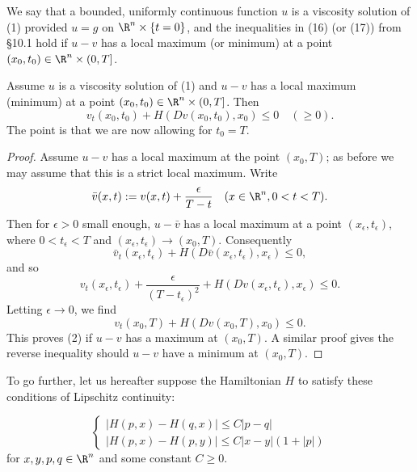 \begin{definition}
\label{def:viscosity-solution-finite-horizon}
We say that a bounded, uniformly continuous function $u$ is a viscosity solution of (1) provided $u = g$ on $\R^n \times \{t = 0\}$, and the inequalities in (16) (or (17)) from \S10.1 hold if $u - v$ has a local maximum (or minimum) at a point $(x_0, t_0) \in \R^n \times (0, T]$.
\end{definition}

\begin{lemma}
\label{lem:extrema-at-terminal-time}
Assume $u$ is a viscosity solution of (1) and $u - v$ has a local maximum (minimum) at a point $(x_0, t_0) \in \R^n \times (0, T]$. Then
\[
v_t(x_0, t_0) + H(Dv(x_0, t_0), x_0) \le 0 \quad (\ge 0).
\tag{2}
\]
The point is that we are now allowing for $t_0 = T$.
\end{lemma}
\begin{proof}
Assume $u - v$ has a local maximum at the point $(x_0, T)$; as before we may assume that this is a strict local maximum. Write
\[
\bar{v}(x,t) := v(x,t) + \frac{\epsilon}{T-t} \quad (x \in \R^n, 0 < t < T).
\]
Then for $\epsilon > 0$ small enough, $u - \bar{v}$ has a local maximum at a point $(x_{\epsilon}, t_{\epsilon})$, where $0 < t_{\epsilon} < T$ and $(x_{\epsilon}, t_{\epsilon}) \to (x_0, T)$. Consequently
\[
\bar{v}_t(x_{\epsilon}, t_{\epsilon}) + H(D\bar{v}(x_{\epsilon}, t_{\epsilon}), x_{\epsilon}) \leq 0,
\]
and so
\[
v_t(x_{\epsilon}, t_{\epsilon}) + \frac{\epsilon}{(T-t_{\epsilon})^2} + H(Dv(x_{\epsilon}, t_{\epsilon}), x_{\epsilon}) \leq 0.
\]
Letting $\epsilon \to 0$, we find
\[
v_t(x_0, T) + H(Dv(x_0, T), x_0) \leq 0.
\]
This proves (2) if $u - v$ has a maximum at $(x_0, T)$. A similar proof gives the reverse inequality should $u - v$ have a minimum at $(x_0, T)$.
\end{proof}

To go further, let us hereafter suppose the Hamiltonian $H$ to satisfy these conditions of Lipschitz continuity:

\begin{definition}
\label{def:hamiltonian-lipschitz-condition}
\[
\begin{cases}
|H(p,x) - H(q,x)| \leq C|p - q| \\
|H(p,x) - H(p,y)| \leq C|x - y|(1 + |p|)
\end{cases}
\tag{3}
\]
for $x, y, p, q \in \R^n$ and some constant $C \geq 0$.
\end{definition}

